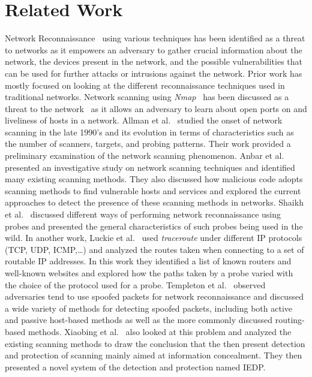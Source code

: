\section{Related Work}
\label{sec:relwork}

Network Reconnaissance~\cite{shaikh2008network, barnett2008towards}
using various techniques has been identified as a threat to networks as
it empowers an adversary to gather crucial information about the network,
the devices present in the network, and the possible vulnerabilities that
can be used for further attacks or intrusions against the network. Prior 
work has mostly focused on looking at the different reconnaissance 
techniques used in traditional networks. Network scanning using 
\textit{Nmap}~\cite{lyon2009nmap} has been discussed as a threat to the
network~\cite{barnett2008towards, anbar2013investigating, allman2007brief}
as it allows an adversary to learn about open ports on and liveliness of
hosts in a network. Allman et al.~\cite{allman2007brief} studied the onset
of network scanning in the late 1990's and its evolution in terms of 
characteristics such as the number of scanners, targets, and probing 
patterns. Their work provided a preliminary examination of the network
scanning phenomenon. Anbar et al.~\cite{anbar2013investigating} presented
an investigative study on network scanning techniques and identified
many existing scanning methods. They also discussed how malicious code 
adopts scanning methods to find vulnerable hosts and services and explored
the current approaches to detect the presence of these scanning methods in
networks. Shaikh et al.~\cite{shaikh2008network} discussed different ways
of performing network reconnaissance using probes and presented the general
characteristics of such probes being used in the wild. In another work, 
Luckie et al.~\cite{luckie2008traceroute} used \textit{traceroute} under 
different IP protocols (TCP, UDP, ICMP,\ldots) and analyzed the routes 
taken when connecting to a set of routable IP addresses. In this work they
identified a list of known routers and well-known websites and explored 
how the paths taken by a probe varied with the choice of the protocol used
for a probe. Templeton et al.~\cite{templeton2003detecting} observed
adversaries tend to use spoofed packets for network reconnaissance and discussed
a wide variety of methods for detecting spoofed packets, including both
active and passive host-based methods as well as the more commonly
discussed routing-based methods. Xiaobing et
al.~\cite{xiaobing2001detection} also looked at this problem and
analyzed the existing scanning methods to draw the conclusion that the
then present detection and protection of scanning mainly aimed at
information concealment. They then presented a novel system of the
detection and protection named IEDP. 

